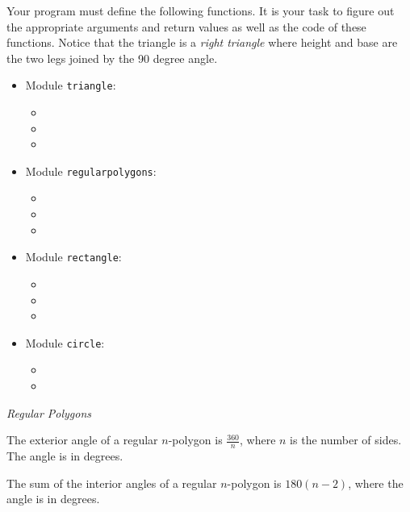\documentclass[11pt]{cselabheader}
\begin{document}
{\begin{ex}
  Your program must define the following functions. It is your task to figure
  out the appropriate arguments and return values as well as the code of these
  functions. Notice that the triangle is a \emph{right triangle} where height
  and base are the two legs joined by the 90 degree angle.
  \begin{multicols}{2}
    \begin{itemize}
      \item Module \texttt{triangle}:
        \begin{itemize}
          \item {}
          \item {}
          \item {}
        \end{itemize}
      \item Module \texttt{regularpolygons}:
        \begin{itemize}
          \item {}
          \item {}
          \item {}
        \end{itemize}
      \item Module \texttt{rectangle}:
        \begin{itemize}
          \item{}
          \item {}
          \item {}
        \end{itemize}
      \item Module \texttt{circle}:
        \begin{itemize}
          \item {}
          \item {}
        \end{itemize}
    \end{itemize}
  \end{multicols}

  \emph{Regular Polygons}

  The exterior angle of a regular $n$-polygon is $\frac{360}{n}$, where $n$ is
  the number of sides. The angle is in degrees.

  The sum of the interior angles of a regular $n$-polygon is $180(n-2)$, where the
  angle is in degrees.


\end{ex}}
\end{document}
